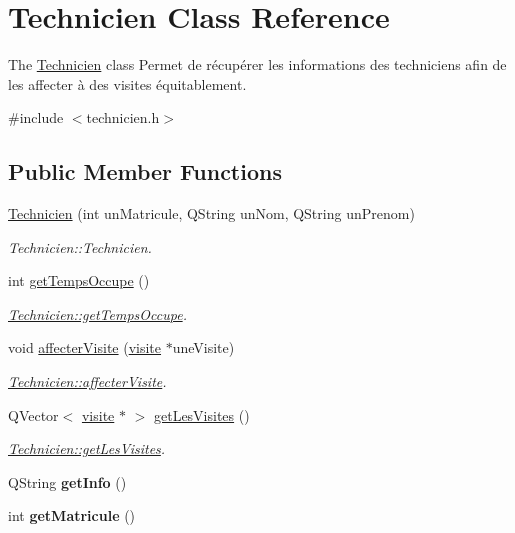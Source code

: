 \hypertarget{class_technicien}{}\section{Technicien Class Reference}
\label{class_technicien}


The \hyperlink{class_technicien}{Technicien} class Permet de récupérer les informations des techniciens afin de les affecter à des visites équitablement.  




{\ttfamily \#include $<$technicien.\+h$>$}

\subsection*{Public Member Functions}
\begin{DoxyCompactItemize}
\item 
\hyperlink{class_technicien_a2b13414c79a7a4f040522c34e0fd0aa6}{Technicien} (int un\+Matricule, Q\+String un\+Nom, Q\+String un\+Prenom)
\begin{DoxyCompactList}\small\item\em Technicien\+::\+Technicien. \end{DoxyCompactList}\item 
int \hyperlink{class_technicien_af111a0a23ae6ce1dbcb552817266744e}{get\+Temps\+Occupe} ()
\begin{DoxyCompactList}\small\item\em \hyperlink{class_technicien_af111a0a23ae6ce1dbcb552817266744e}{Technicien\+::get\+Temps\+Occupe}. \end{DoxyCompactList}\item 
void \hyperlink{class_technicien_ae214082b07ffa459ebfb99e9efd4da20}{affecter\+Visite} (\hyperlink{classvisite}{visite} $\ast$une\+Visite)
\begin{DoxyCompactList}\small\item\em \hyperlink{class_technicien_ae214082b07ffa459ebfb99e9efd4da20}{Technicien\+::affecter\+Visite}. \end{DoxyCompactList}\item 
Q\+Vector$<$ \hyperlink{classvisite}{visite} $\ast$ $>$ \hyperlink{class_technicien_a8ad18bf2c5758dbb6261594c544e47f9}{get\+Les\+Visites} ()
\begin{DoxyCompactList}\small\item\em \hyperlink{class_technicien_a8ad18bf2c5758dbb6261594c544e47f9}{Technicien\+::get\+Les\+Visites}. \end{DoxyCompactList}\item 
\mbox{\label{class_technicien_a82c56619d7835292c0cfe48ceb05fa21}} 
Q\+String {\bfseries get\+Info} ()
\item 
\mbox{\label{class_technicien_a6fe07be5429f9239023e4a8f551505ad}} 
int {\bfseries get\+Matricule} ()
\end{DoxyCompactItemize}


